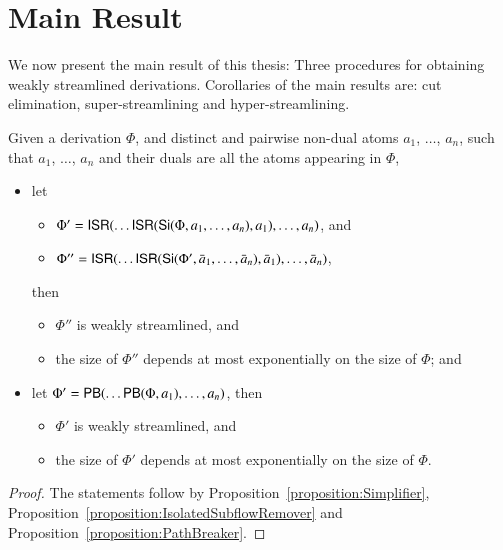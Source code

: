 \section{Main Result}\label{section:MainResult}


We now present the main result of this thesis: Three procedures for obtaining weakly streamlined derivations. Corollaries of the main results are: cut elimination, super-streamlining and hyper-streamlining.

\begin{theorem}\label{theorem:WeakStreamlining}
Given a derivation $\Phi$, and distinct and pairwise non-dual atoms $a_1$, $\dots$, $a_n$, such that $a_1$, $\dots$, $a_n$ and their duals are all the atoms appearing in $\Phi$,
\begin{itemize}
\item let
\begin{itemize}
\item $\Phi'=\mathsf{ISR}(\dots\mathsf{ISR}(\mathsf{Si}(\Phi,a_1,\dots,a_n),a_1),\dots,a_n)$, and
\item $\Phi''=\mathsf{ISR}(\dots\mathsf{ISR}(\mathsf{Si}(\Phi',\bar a_1,\dots,\bar a_n),\bar a_1),\dots,\bar a_n)$,
\end{itemize}
then
\begin{itemize}
\item $\Phi''$ is weakly streamlined, and
\item the size of $\Phi''$ depends at most exponentially on the size of\/ $\Phi$; and
\end{itemize}
\item let\/ $\Phi'=\mathsf{PB}(\dots\mathsf{PB}(\Phi,a_1),\dots,a_n)$, then
\begin{itemize}
\item $\Phi'$ is weakly streamlined, and
\item the size of\/ $\Phi'$ depends at most exponentially on the size of\/ $\Phi$.
\end{itemize}
\end{itemize}
\end{theorem}

\begin{proof}
The statements follow by Proposition~\vref{proposition:Simplifier}, Proposition~\vref{proposition:IsolatedSubflowRemover} and Proposition~\vref{proposition:PathBreaker}.
\end{proof}

